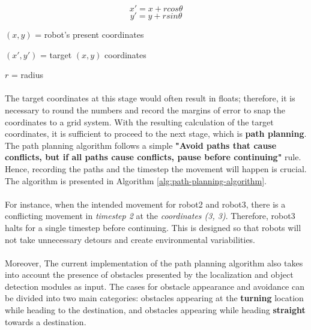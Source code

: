 \[x' = x + rcos\theta\]
\[y' = y + rsin\theta\]

\begin{description}
    \item 
    \item[where:]
    \item \((x, y)\) = robot's present coordinates
    \item \((x', y')\) = target \((x, y)\) coordinates
    \item \(r\) = radius
\end{description}

\paragraph*{}
The target coordinates at this stage would often result in floats; therefore, it is necessary to round the numbers and record the margins of error to snap the coordinates to a grid system. With the resulting calculation of the target coordinates, it is sufficient to proceed to the next stage, which is \textbf{path planning}. The path planning algorithm follows a simple \textbf{"Avoid paths that cause conflicts, but if all paths cause conflicts, pause before continuing"} rule. Hence, recording the paths and the timestep the movement will happen is crucial. The algorithm is presented in Algorithm \ref{alg:path-planning-algorithm}.

\paragraph*{}
For instance, when the intended movement for robot2 and robot3, there is a conflicting movement in \textit{timestep 2} at the \textit{coordinates (3, 3)}. Therefore, robot3 halts for a single timestep before continuing. This is designed so that robots will not take unnecessary detours and create environmental variabilities.

\paragraph*{}
Moreover, The current implementation of the path planning algorithm also takes into account the presence of obstacles presented by the localization and object detection modules as input. The cases for obstacle appearance and avoidance can be divided into two main categories: obstacles appearing at the \textbf{turning} location while heading to the destination, and obstacles appearing while heading \textbf{straight} towards a destination.

